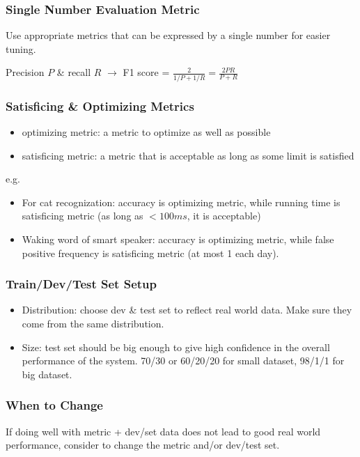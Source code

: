 \subsubsection{Single Number Evaluation Metric}
Use appropriate metrics that can be expressed by a single number for easier tuning.

Precision $P$ \& recall $R$ $\rightarrow$ F1 score = $\frac{2}{1/P+1/R}=\frac{2PR}{P+R}$
\subsubsection{Satisficing \& Optimizing Metrics}
\begin{itemize}
  \item optimizing metric: a metric to optimize as well as possible
  \item satisficing metric: a metric that is acceptable as long as some limit is satisfied
\end{itemize}
e.g. 
\begin{itemize}
  \item For cat recognization: accuracy is optimizing metric, while running time is satisficing metric (as long as $<100ms$, it is acceptable)
  \item Waking word of smart speaker: accuracy is optimizing metric, while false positive frequency is satisficing metric (at most 1 each day).
\end{itemize}
\subsubsection{Train/Dev/Test Set Setup}
\begin{itemize}
  \item Distribution: choose dev \& test set to reflect real world data. Make sure they come from the same distribution.
  \item Size: test set should be big enough to give high confidence in the overall performance of the system. 70/30 or 60/20/20 for small dataset, 98/1/1 for big dataset.
\end{itemize}
\subsubsection{When to Change}
If doing well with metric + dev/set data does not lead to good real world performance, consider to change the metric and/or dev/test set.
\ifx\PREAMBLE\undefined

\fi